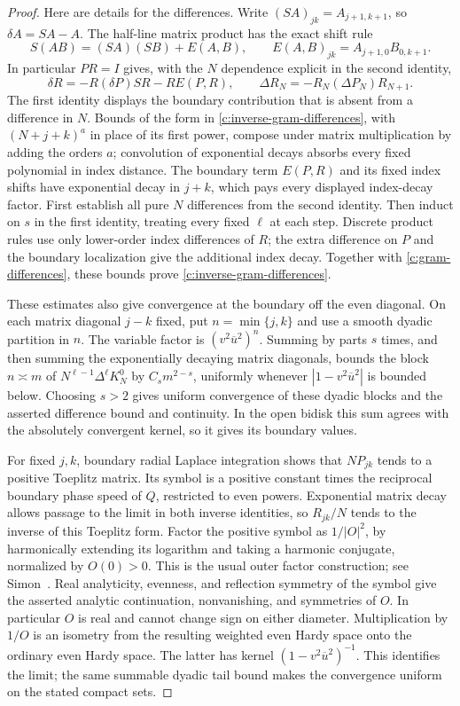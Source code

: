 \documentclass[11pt]{article}
\numberwithin{equation}{section}
\theoremstyle{definition}\newtheorem{definition}[theorem]{Definition}
\theoremstyle{remark}\newtheorem{remark}[theorem]{Remark}
\begin{document}
\begin{proof}
Here are details for the differences.  Write
$(SA)_{jk}=A_{j+1,k+1}$, so $\delta A=SA-A$.  The half-line matrix
product has the exact shift rule
\[
 S(AB)=(SA)(SB)+E(A,B),\qquad
 E(A,B)_{jk}=A_{j+1,0}B_{0,k+1}.
\]
In particular $PR=I$ gives, with the $N$ dependence explicit in the
second identity,
\[
 \delta R=-R(\delta P)SR-R E(P,R),
 \qquad
 \Delta R_N=-R_N(\Delta P_N)R_{N+1}.
\]
The first identity displays the boundary contribution that is absent
from a difference in $N$.  Bounds of the form in
\eqref{c:inverse-gram-differences}, with $(N+j+k)^a$ in place of its
first power, compose under matrix multiplication by adding the orders
$a$; convolution of exponential decays absorbs every fixed polynomial
in index distance.  The boundary term $E(P,R)$ and its fixed index
shifts have exponential decay in $j+k$, which pays every displayed
index-decay factor.  First establish all pure $N$ differences from the
second identity.  Then induct on $s$ in the first identity, treating
every fixed $\ell$ at each step.  Discrete product rules use only
lower-order index differences of $R$; the extra difference on $P$ and
the boundary localization give the additional index decay.  Together
with \eqref{c:gram-differences}, these bounds prove
\eqref{c:inverse-gram-differences}.

These estimates also give convergence at the boundary off the even
diagonal.  On each matrix diagonal $j-k$ fixed, put
$n=\min\{j,k\}$ and use a smooth dyadic partition in $n$.
The variable factor is $(v^2\overline u^2)^n$.
Summing by parts $s$ times, and then summing the exponentially decaying
matrix diagonals, bounds the block $n\asymp m$ of
$N^{\ell-1}\Delta^\ell K_N^0$ by $C_sm^{2-s}$, uniformly whenever
$|1-v^2\overline u^2|$ is bounded below.  Choosing $s>2$ gives
uniform convergence of these dyadic blocks and the asserted difference
bound and continuity.  In the open bidisk this sum agrees with the
absolutely convergent kernel, so it gives its boundary values.

For fixed $j,k$, boundary radial Laplace integration shows that
$NP_{jk}$ tends to a positive Toeplitz matrix.  Its symbol is a
positive constant times the reciprocal boundary phase speed of $Q$,
restricted to even powers.  Exponential matrix decay allows passage
to the limit in both inverse identities, so $R_{jk}/N$ tends to the
inverse of this Toeplitz form.  Factor the positive symbol as
$1/|O|^2$, by harmonically extending its logarithm and taking a
harmonic conjugate, normalized by $O(0)>0$.  This is the usual outer
factor construction; see Simon~\cite[Section 5]{Simon2005Szego}.
Real analyticity,
evenness, and reflection symmetry of the symbol give the asserted
analytic continuation, nonvanishing, and symmetries of $O$.
In particular $O$ is real and cannot change sign on either diameter.
Multiplication by $1/O$ is an isometry from the resulting weighted
even Hardy space onto the ordinary even Hardy space.  The latter has
kernel $(1-v^2\overline u^2)^{-1}$.  This identifies the limit;
the same summable dyadic tail bound makes the convergence uniform on
the stated compact sets.
\end{proof}
\end{document}
